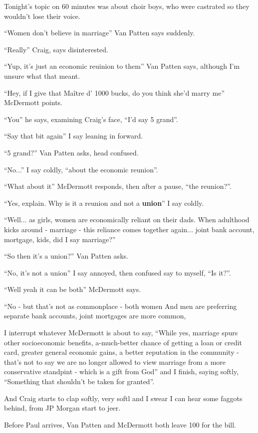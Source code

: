 \documentclass[19pt,openany]{book}
\begin{document}
Tonight's topic on
60 minutes was about choir boys, who were
castrated so they wouldn't lose their voice.

``Women don't believe in marriage'' Van Patten says
suddenly.

``Really'' Craig, says disinterested.

``Yup, it's just an economic reuinion to them'' Van
Patten says, although I'm unsure what
that meant.

``Hey, if I give that Maître d' 1000 bucks,
do you think she'd marry me'' McDermott points.

``You'' he says, examining Craig's face, ``I'd
say 5 grand''.

``Say that bit again'' I say leaning in forward.

``5 grand?'' Van Patten asks, head confused.

``No...'' I say coldly, ``about the economic
reunion''.

``What about it'' McDermott responds, then
after a pause, ``the reunion?''.

``Yes, explain. Why is
it a reunion and not a
\textbf{union}'' I say coldly.

``Well... as girls,
women are economically
reliant on their dads.
When adulthood kicks
around - marriage - this
reliance comes together
again... joint bank
account, mortgage,
kids, did I say marriage?''

``So then it's a union?'' Van Patten
asks.

``No, it's not a union''
I say annoyed, then
confused say to myself, ``Is it?''.

``Well yeah it can be both''
McDermott says.

``No - but that's not
as commonplace - both
women And men are preferring
separate bank accounts,
joint mortgages are
more common,

I interrupt whatever
McDermott is about to say,
``While yes,
marriage spurs other
socioeconomic benefits,
a-much-better chance
of getting a loan or
credit card, greater
general economic gains,
a better reputation
in the community - that's
not to say we are no longer allowed
to view marriage from a more conservative
standpint - which
is a gift from God''
and I finish, saying
softly, ``Something
that shouldn't
be taken for granted''.

And Craig starts to clap softly,
very softl and I swear I can hear some faggots behind,
from JP Morgan start to jeer.

Before Paul arrives,
Van Patten and McDermott
both leave 100 for the
bill.
\end{document}
